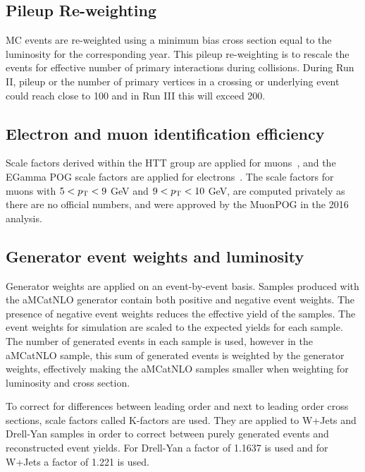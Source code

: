\subsection{Pileup Re-weighting}

MC events are re-weighted using a minimum bias cross section equal to the luminosity for the corresponding year. This pileup re-weighting is to rescale the events for effective number of primary interactions during collisions. During Run II, pileup or the number of primary vertices in a crossing or underlying event could reach close to 100 and in Run III this will exceed 200.   

\subsection{Electron and muon identification efficiency}

Scale factors derived within the HTT group are applied for muons~\cite{AN16355}, and the EGamma POG scale factors are applied for electrons~\cite{EGammaMVAID}. The scale factors for muons with $5<p_{\mathrm{T}}<9$ GeV and $9<p_{\mathrm{T}}<10$ GeV, are computed privately as there are no official numbers, and were approved by the MuonPOG in the 2016 analysis. 
  


\subsection{Generator event weights and luminosity}

Generator weights are applied on an event-by-event basis. Samples produced with the aMCatNLO generator contain both positive and negative event weights. The presence of negative event weights reduces the
effective yield of the samples.
The event weights for simulation are scaled to the expected yields for each sample. The number
of generated events in each sample is used, however in the aMCatNLO sample, this sum of
generated events is weighted by the generator weights, effectively making the aMCatNLO
samples smaller when weighting for luminosity and cross section.

To correct for differences between leading order and next to leading order cross sections, scale factors called K-factors are used. They are applied to W+Jets and Drell-Yan samples in order to correct between purely generated events and reconstructed event yields. For Drell-Yan a factor of 1.1637 is used and for W+Jets a factor of 1.221 is used.
%
%

